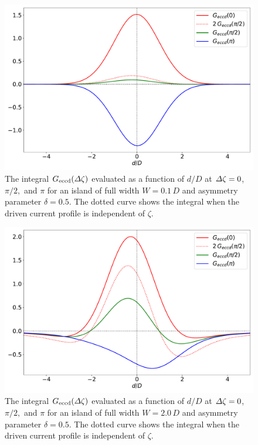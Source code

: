 \documentclass{iopjournal}
\begin{document}
{\begin{figure}
\centerline{\includegraphics[width=\textwidth]{Fig9.pdf}}
\caption{The integral $G_{\rm eccd}({\mit\Delta}\zeta)$ evaluated as a function of $d/D$ at ${\mit\Delta}\zeta = 0$, $\pi/2,$ and $\pi$ for an  island
of full width $W=0.1\,D$ and asymmetry parameter $\delta=0.5$. The dotted curve shows the integral when the driven current profile is independent of $\zeta$. \label{fig7}}
\end{figure}

\begin{figure}
\centerline{\includegraphics[width=\textwidth]{Fig10.pdf}}
\caption{The integral $G_{\rm eccd}({\mit\Delta}\zeta)$ evaluated as a function of $d/D$ at ${\mit\Delta}\zeta = 0$, $\pi/2,$ and $\pi$  for an  island
of full width $W=2.0\,D$ and asymmetry parameter $\delta=0.5$. The dotted curve shows the integral when the driven current profile is independent of $\zeta$. \label{fig8}}
\end{figure}

}
\end{document}

